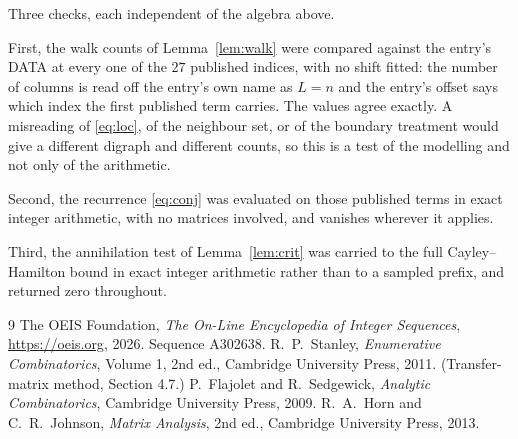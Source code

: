 \documentclass[11pt,a4paper]{article}
\theoremstyle{plain}
\theoremstyle{definition}
\begin{document}
Three checks, each independent of the algebra above.

First, the walk counts of Lemma~\ref{lem:walk} were compared against the entry's DATA at
every one of the $27$ published indices, with no shift fitted: the number of columns is
read off the entry's own name as $L=n$ and the entry's offset says which index the first
published term carries. The values agree exactly. A misreading of \eqref{eq:loc}, of the
neighbour set, or of the boundary treatment would give a different digraph and different
counts, so this is a test of the modelling and not only of the arithmetic.

Second, the recurrence \eqref{eq:conj} was evaluated on those published terms in exact
integer arithmetic, with no matrices involved, and vanishes wherever it applies.

Third, the annihilation test of Lemma~\ref{lem:crit} was carried to the full
Cayley--Hamilton bound in exact integer arithmetic rather than to a sampled prefix, and
returned zero throughout.

\begin{thebibliography}{9}
 The OEIS Foundation, \emph{The On-Line Encyclopedia of Integer
Sequences}, \url{https://oeis.org}, 2026. Sequence A302638.
 R.~P.~Stanley, \emph{Enumerative Combinatorics}, Volume 1, 2nd ed.,
Cambridge University Press, 2011. (Transfer-matrix method, Section 4.7.)
 P.~Flajolet and R.~Sedgewick, \emph{Analytic Combinatorics}, Cambridge
University Press, 2009.
 R.~A.~Horn and C.~R.~Johnson, \emph{Matrix Analysis}, 2nd ed., Cambridge
University Press, 2013.
\end{thebibliography}
\end{document}
